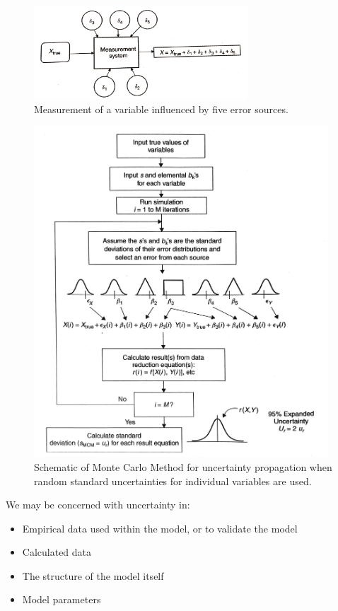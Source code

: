 \documentclass[10pt]{article}
\begin{document}
\medskip
            \begin{figure}[h]
            \centering
            \includegraphics[width=8cm]{extras27/meas}
            \caption{Measurement of a variable influenced by five error sources. \cite{Coleman2009-wb}}
            \label{coleman1.4}
            \end{figure}
\bigskip

\medskip
            \begin{figure}[h]
            \centering
            \includegraphics[width=11cm]{extras27/schem}
            \caption{Schematic of Monte Carlo Method for uncertainty propagation when random standard uncertainties for individual variables are used. \cite{Coleman2009-wb}}
            \label{coleman3.4}
            \end{figure}
\bigskip

We may be concerned with uncertainty in:
\begin{itemize}
\item Empirical data used within the model, or to validate the model
\item Calculated data
\item The structure of the model itself
\item Model parameters
\end{itemize}
\end{document}
